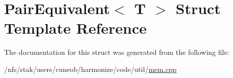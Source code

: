 \hypertarget{structPairEquivalent}{\section{Pair\-Equivalent$<$ T $>$ Struct Template Reference}
\label{structPairEquivalent}
}


The documentation for this struct was generated from the following file\-:\begin{DoxyCompactItemize}
\item 
/nfs/stak/users/cuneob/harmonize/code/util/\hyperlink{mem_8cpp}{mem.\-cpp}\end{DoxyCompactItemize}

